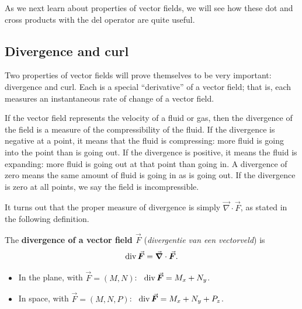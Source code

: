As we next learn about properties of vector fields, we will see how these dot and cross products with the del operator are quite useful.

\subsection{Divergence and curl}
	\checkoddpage
{}
Two properties of vector fields will prove themselves to be very important: divergence and curl. Each is a special ``derivative'' of a vector field; that is, each measures an instantaneous rate of change of a vector field.

If the vector field represents the velocity of a fluid or gas, then the divergence of the field is a measure of the compressibility of the fluid. If the divergence is negative at a point, it means that the fluid is compressing: more fluid is going into the point than is going out. If the divergence is positive, it means the fluid is expanding: more fluid is going out at that point than going in. A divergence of zero means the same amount of fluid is going in as is going out. If the divergence is zero at all points, we say the field is incompressible.

It turns out that the proper measure of divergence is simply $\vec{\nabla} \cdot \vec F$, as stated in the following definition.

\begin{definition}[Divergence]\label{def:divergence}
The \textbf{divergence of a vector field $\vec F$} (\textit{divergentie van een vectorveld}) is
$$\divv \vec F = \vec{\nabla} \cdot \vec F.$$
\begin{itemize}
	\item In the plane, with $\vec F = \left( M,N\right)$: \  $\divv \vec F = M_x+N_y$.
	\item In space, with $\vec F = \left( M,N,P\right)$: \  $\divv \vec F = M_x+N_y+P_z$.
\end{itemize}
\end{definition}

